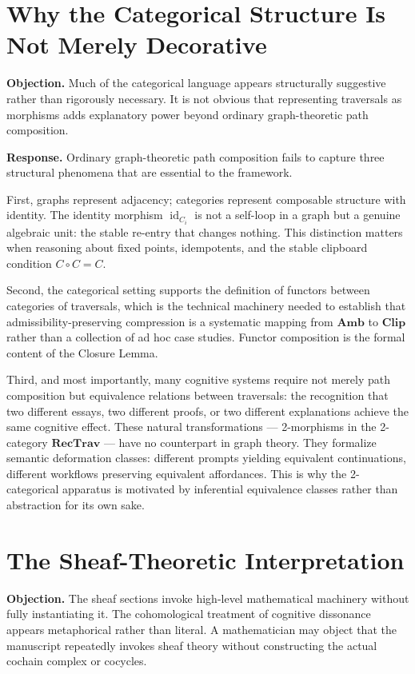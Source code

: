 \documentclass[12pt,oneside]{book}
\theoremstyle{plain}
\theoremstyle{definition}
\theoremstyle{plain}
\DeclareMathOperator{\id}{id}
\newcommand{\Clip}{\mathbf{Clip}}
\newcommand{\Amb}{\mathbf{Amb}}
\newcommand{\RecTrav}{\mathbf{RecTrav}}
\begin{document}
\section{Why the Categorical Structure Is Not Merely Decorative}

\textbf{Objection.} Much of the categorical language appears structurally suggestive rather than rigorously necessary. It is not obvious that representing traversals as morphisms adds explanatory power beyond ordinary graph-theoretic path composition.

\textbf{Response.} Ordinary graph-theoretic path composition fails to capture three structural phenomena that are essential to the framework.

First, graphs represent adjacency; categories represent composable structure with identity. The identity morphism $\id_{C_i}$ is not a self-loop in a graph but a genuine algebraic unit: the stable re-entry that changes nothing. This distinction matters when reasoning about fixed points, idempotents, and the stable clipboard condition $C \circ C = C$.

Second, the categorical setting supports the definition of functors between categories of traversals, which is the technical machinery needed to establish that admissibility-preserving compression is a systematic mapping from $\Amb$ to $\Clip$ rather than a collection of ad hoc case studies. Functor composition is the formal content of the Closure Lemma.

Third, and most importantly, many cognitive systems require not merely path composition but equivalence relations between traversals: the recognition that two different essays, two different proofs, or two different explanations achieve the same cognitive effect. These natural transformations — 2-morphisms in the 2-category $\RecTrav$ — have no counterpart in graph theory. They formalize semantic deformation classes: different prompts yielding equivalent continuations, different workflows preserving equivalent affordances. This is why the 2-categorical apparatus is motivated by inferential equivalence classes rather than abstraction for its own sake.

\section{The Sheaf-Theoretic Interpretation}

\textbf{Objection.} The sheaf sections invoke high-level mathematical machinery without fully instantiating it. The cohomological treatment of cognitive dissonance appears metaphorical rather than literal. A mathematician may object that the manuscript repeatedly invokes sheaf theory without constructing the actual cochain complex or cocycles.
\end{document}
